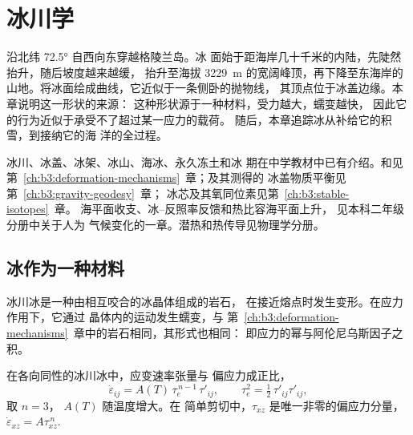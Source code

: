 \chapter{冰川学}\label{ch:b3:glaciology}

沿北纬 \ang{72.5} 自西向东穿越格陵兰岛。冰
面始于距海岸几十千米的内陆，先陡然抬升，随后坡度越来越缓，
抬升至海拔 \qty{3229}{m} 的宽阔峰顶，再下降至东海岸的
山地。将冰面绘成曲线，它近似于一条侧卧的抛物线，
其顶点位于冰盖边缘。本章说明这一形状的来源：
这种形状源于一种材料，受力越大，蠕变越快，
因此它的行为近似于承受不了超过某一应力的载荷。
随后，本章追踪冰从补给它的积雪，到接纳它的海
洋的全过程。

\begin{recall}
冰川、冰盖、冰架、冰山、海冰、永久冻土和冰
期在中学教材中已有介绍。和见
第~\ref{ch:b3:deformation-mechanisms}~章；及其测得的
冰盖物质平衡见第~\ref{ch:b3:gravity-geodesy}~章；
冰芯及其氧同位素见第~\ref{ch:b3:stable-isotopes}~章。
海平面收支、冰–反照率反馈和热比容海平面上升，
见本科二年级分册中关于人为
气候变化的一章。潜热和热传导见物理学分册。
\end{recall}

\section{冰作为一种材料}\label{sec:b3:glaciology:material}

冰川冰是一种由相互咬合的冰晶体组成的岩石，
在接近熔点时发生变形。在应力作用下，它通过
晶体内的运动发生蠕变，与
第~\ref{ch:b3:deformation-mechanisms}~章中的岩石相同，其形式也相同：
即应力的幂与阿伦尼乌斯因子之积。

\begin{theorem}[格伦流动定律]\label{thm:b3:glaciology:glen}
在各向同性的冰川冰中，应变速率张量与
偏应力成正比，
\[
\dot\varepsilon_{ij} = A(T)\,\tau_e^{\,n-1}\,\tau'_{ij}, \qquad
\tau_e^2 = \tfrac12\,\tau'_{ij}\tau'_{ij},
\]
取 $n = 3$， $A(T)$ 随温度增大。在
简单剪切中，$\tau_{xz}$ 是唯一非零的偏应力分量，
$\dot\varepsilon_{xz} = A\tau_{xz}^{\,n}$.
\end{theorem}

